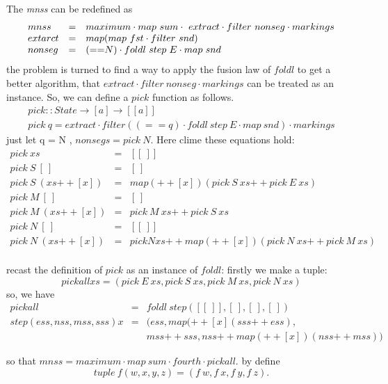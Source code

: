\documentclass[10pt,a4paper]{article}
\newcommand{\concat}{\mathbin{+\!\!+}}
\begin{document}
The \emph{mnss} can be redefined as 
\[
\begin{array}{lll}

mnss &=& maximum \cdot map ~ sum \cdot ~ extract \cdot filter ~ nonseg \cdot markings \\
extarct &=& map(map ~ fst \cdot filter ~ snd) \\
nonseg &=& (\small{==} N) \cdot foldl~step~E \cdot map ~ snd
\end{array}
\]
the problem is turned to find a way to apply the fusion law of $foldl$ to get a better algorithm,
that  \( extract \cdot filter ~ nonseg \cdot markings \) can be treated as an instance.
So, we can define a $pick$ function as follows.
\[
\begin{array}{lll}
pick :: State \rightarrow [a] \rightarrow [[a]] \\
pick ~ q = extract \cdot filter((==q) \cdot foldl ~ step ~ E \cdot map~ snd) \cdot markings
\end{array}
\]
just let q = N , \( nonsegs = pick~ N \).
Here clime these equations hold:
\[
\begin{array}{lll}
pick~ xs                  &=& [[~]] \\
pick~ S ~ [~]              &=& [~] \\
pick~ S ~(xs \concat [x] ) &=& map(\concat [x])(pick ~ S~xs \concat pick ~E~xs) \\
pick~ M ~[~] &=& [~] \\
pick~ M ~(xs \concat [x] ) &=& pick~M~xs \concat pick~S~xs \\
pick~ N ~[~] &=& [[~]] \\
pick~ N ~(xs \concat [x] ) &=& pick N xs \concat map(\concat [x])(pick ~ N~xs \concat pick ~M~xs) \\
\end{array}
\]

recast the definition of $pick$ as an instance of $foldl$:
firstly we make a tuple:
\[
pickall xs = (pick~E~xs, pick~S~xs,pick~M~xs,pick~N~xs)
\]
so, we have
\[
\begin{array}{lll}
pickall &=& foldl~ step([[~]],[~],[~],[~]) \\
step (ess,nss,mss,sss) x &=& (ess, map(\concat [x](sss \concat ess), \\
& \, &mss \concat sss, nss \concat map(\concat [x])(nss \concat mss) ) 
\end{array}
\]

so that \(mnss = maximum \cdot map~sum \cdot fourth \cdot pickall \). by define 
\[ 
tuple ~ f(w,x,y,z) = (f~w, f~x, f~y, f~z).
\]
\end{document}
